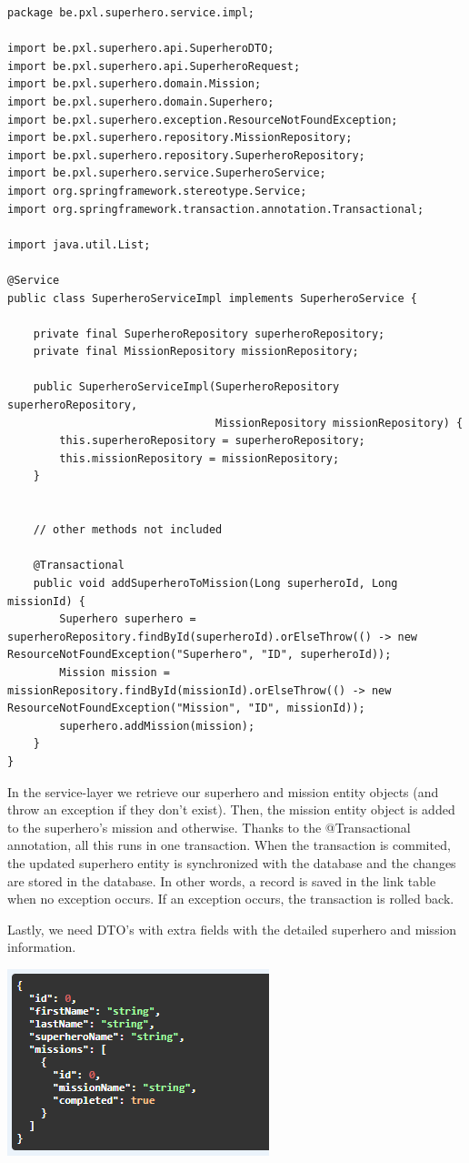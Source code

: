 \begin{lstlisting}
package be.pxl.superhero.service.impl;

import be.pxl.superhero.api.SuperheroDTO;
import be.pxl.superhero.api.SuperheroRequest;
import be.pxl.superhero.domain.Mission;
import be.pxl.superhero.domain.Superhero;
import be.pxl.superhero.exception.ResourceNotFoundException;
import be.pxl.superhero.repository.MissionRepository;
import be.pxl.superhero.repository.SuperheroRepository;
import be.pxl.superhero.service.SuperheroService;
import org.springframework.stereotype.Service;
import org.springframework.transaction.annotation.Transactional;

import java.util.List;

@Service
public class SuperheroServiceImpl implements SuperheroService {

    private final SuperheroRepository superheroRepository;
    private final MissionRepository missionRepository;

    public SuperheroServiceImpl(SuperheroRepository superheroRepository,
                                MissionRepository missionRepository) {
        this.superheroRepository = superheroRepository;
        this.missionRepository = missionRepository;
    }

   
    // other methods not included 

    @Transactional
    public void addSuperheroToMission(Long superheroId, Long missionId) {
        Superhero superhero = superheroRepository.findById(superheroId).orElseThrow(() -> new ResourceNotFoundException("Superhero", "ID", superheroId));
        Mission mission = missionRepository.findById(missionId).orElseThrow(() -> new ResourceNotFoundException("Mission", "ID", missionId));
        superhero.addMission(mission);
    }
}
\end{lstlisting}

In the service-layer we retrieve our superhero and mission entity objects (and throw an exception if they don't exist). Then, the mission entity object is added to the superhero's mission and otherwise. Thanks to the @Transactional annotation, all this runs in one transaction. When the transaction is commited, the updated superhero entity is synchronized with the database and the changes are stored in the database. In other words, a record is saved in the link table when no exception occurs. If an exception occurs, the transaction is rolled back.


Lastly, we need DTO's with extra fields with the detailed superhero and mission information.

\includegraphics{./images/chapter-jpa/superhero_detail_dto}




